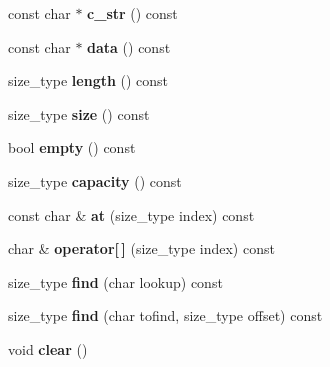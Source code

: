 \begin{DoxyCompactItemize}
\hypertarget{class_ti_xml_string_ae2bd36349215612ebcc3cb221c30bd3d}{}\label{class_ti_xml_string_ae2bd36349215612ebcc3cb221c30bd3d} 
const char $\ast$ {\bfseries c\+\_\+str} () const
\item 
\hypertarget{class_ti_xml_string_a0e010e1737cfc3ee885b42875171b88e}{}\label{class_ti_xml_string_a0e010e1737cfc3ee885b42875171b88e} 
const char $\ast$ {\bfseries data} () const
\item 
\hypertarget{class_ti_xml_string_a5db17f8314ffe2a89df0f0eb6c2a4bf5}{}\label{class_ti_xml_string_a5db17f8314ffe2a89df0f0eb6c2a4bf5} 
size\+\_\+type {\bfseries length} () const
\item 
\hypertarget{class_ti_xml_string_a483d85103d2a3ba8c0831e205c832f33}{}\label{class_ti_xml_string_a483d85103d2a3ba8c0831e205c832f33} 
size\+\_\+type {\bfseries size} () const
\item 
\hypertarget{class_ti_xml_string_a3139aafb0f0a8e26d1a4ed58a50f3678}{}\label{class_ti_xml_string_a3139aafb0f0a8e26d1a4ed58a50f3678} 
bool {\bfseries empty} () const
\item 
\hypertarget{class_ti_xml_string_a0ca248f026e698f79b8aa4c9ab8e1571}{}\label{class_ti_xml_string_a0ca248f026e698f79b8aa4c9ab8e1571} 
size\+\_\+type {\bfseries capacity} () const
\item 
\hypertarget{class_ti_xml_string_a7f33c37f7dfde5193f02521d2a7af1db}{}\label{class_ti_xml_string_a7f33c37f7dfde5193f02521d2a7af1db} 
const char \& {\bfseries at} (size\+\_\+type index) const
\item 
\hypertarget{class_ti_xml_string_a06e8c84831fc146610369405f4aa4200}{}\label{class_ti_xml_string_a06e8c84831fc146610369405f4aa4200} 
char \& {\bfseries operator\mbox{[}$\,$\mbox{]}} (size\+\_\+type index) const
\item 
\hypertarget{class_ti_xml_string_a22fc54a23c5a0ab771331a25a769516e}{}\label{class_ti_xml_string_a22fc54a23c5a0ab771331a25a769516e} 
size\+\_\+type {\bfseries find} (char lookup) const
\item 
\hypertarget{class_ti_xml_string_a2d66cfd6986faceda62ca62db553a921}{}\label{class_ti_xml_string_a2d66cfd6986faceda62ca62db553a921} 
size\+\_\+type {\bfseries find} (char tofind, size\+\_\+type offset) const
\item 
\hypertarget{class_ti_xml_string_ab20e06e4c666abf3bdbfb3a1191d4888}{}\label{class_ti_xml_string_ab20e06e4c666abf3bdbfb3a1191d4888} 
void {\bfseries clear} ()
\item 
\hypertarget{class_ti_xml_string_a88ecf9f0f00cb5c67b6b637958d7049c}{}\label{class_ti_xml_string_a88ecf9f0f00cb5c67b6b637958d7049c} 

\end{DoxyCompactItemize}
